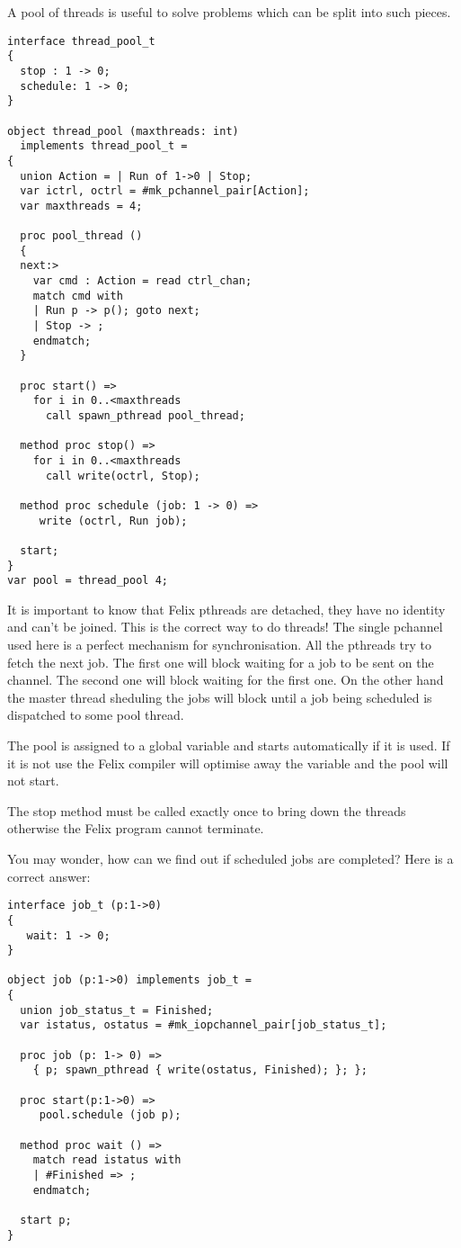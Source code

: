 \documentclass[oneside]{book}
\begin{document}
A pool of threads is useful to solve problems which can
be split into such pieces.

\begin{verbatim}
interface thread_pool_t
{
  stop : 1 -> 0;
  schedule: 1 -> 0;
}

object thread_pool (maxthreads: int) 
  implements thread_pool_t =
{
  union Action = | Run of 1->0 | Stop;
  var ictrl, octrl = #mk_pchannel_pair[Action];
  var maxthreads = 4;

  proc pool_thread ()
  {
  next:>
    var cmd : Action = read ctrl_chan;
    match cmd with
    | Run p -> p(); goto next;
    | Stop -> ;
    endmatch;
  }

  proc start() =>
    for i in 0..<maxthreads
      call spawn_pthread pool_thread;

  method proc stop() =>
    for i in 0..<maxthreads
      call write(octrl, Stop);

  method proc schedule (job: 1 -> 0) =>
     write (octrl, Run job);

  start;
}
var pool = thread_pool 4;
\end{verbatim}

It is important to know that Felix pthreads are detached,
they have no identity and can't be joined. This is the correct
way to do threads! The single pchannel used here is a perfect
mechanism for synchronisation. All the pthreads try to fetch
the next job. The first one will block waiting for a job to
be sent on the channel. The second one will block waiting
for the first one. On the other hand the master thread sheduling
the jobs will block until a job being scheduled is dispatched
to some pool thread.

The pool is assigned to a global variable and starts automatically
if it is used. If it is not use the Felix compiler will optimise
away the variable and the pool will not start.

The stop method must be called exactly once to bring down the threads
otherwise the Felix program cannot terminate.

You may wonder, how can we find out if scheduled jobs are 
completed? Here is a correct answer:

\begin{verbatim}
interface job_t (p:1->0) 
{
   wait: 1 -> 0;
}

object job (p:1->0) implements job_t =
{
  union job_status_t = Finished;
  var istatus, ostatus = #mk_iopchannel_pair[job_status_t];

  proc job (p: 1-> 0) =>
    { p; spawn_pthread { write(ostatus, Finished); }; };

  proc start(p:1->0) =>
     pool.schedule (job p);

  method proc wait () =>
    match read istatus with
    | #Finished => ;
    endmatch;

  start p;
} 
\end{verbatim}
\end{document}
